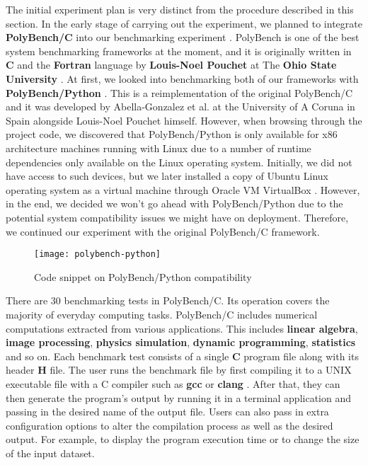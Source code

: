 The initial experiment plan is very distinct from the procedure described in this section. In the early stage of carrying out the experiment, we planned to integrate \textbf{PolyBench/C} into our benchmarking experiment \cite{exp39}. PolyBench is one of the best system benchmarking frameworks at the moment, and it is originally written in \textbf{C} and the \textbf{Fortran} language by \textbf{Louis-Noel Pouchet} at The \textbf{Ohio State University} \cite{exp40}. At first, we looked into benchmarking both of our frameworks with \textbf{PolyBench/Python} \cite{exp41}. This is a reimplementation of the original PolyBench/C and it was developed by Abella-Gonzalez et al. at the University of A Coruna in Spain alongside Louis-Noel Pouchet himself. However, when browsing through the project code, we discovered that PolyBench/Python is only available for x86 architecture machines running with Linux due to a number of runtime dependencies only available on the Linux operating system. Initially, we did not have access to such devices, but we later installed a copy of Ubuntu Linux operating system as a virtual machine through Oracle VM VirtualBox \cite{exp42} \cite{exp43}. However, in the end, we decided we won't go ahead with PolyBench/Python due to the potential system compatibility issues we might have on deployment. Therefore, we continued our experiment with the original PolyBench/C framework.

\bigskip
\begin{figure}[hp]
\centering
\texttt{[image: polybench-python]}
\caption{\footnotesize{Code snippet on PolyBench/Python compatibility}}
\captionsetup{aboveskip=0pt,font=it}
\end{figure}
\bigskip

There are 30 benchmarking tests in PolyBench/C. Its operation covers the majority of everyday computing tasks. PolyBench/C includes numerical computations extracted from various applications. This includes \textbf{linear algebra}, \textbf{image processing}, \textbf{physics simulation}, \textbf{dynamic programming}, \textbf{statistics} and so on. Each benchmark test consists of a single \textbf{C} program file along with its header \textbf{H} file. The user runs the benchmark file by first compiling it to a UNIX executable file with a C compiler such as \textbf{gcc} or \textbf{clang} \cite{exp44} \cite{exp45}. After that, they can then generate the program's output by running it in a terminal application and passing in the desired name of the output file. Users can also pass in extra configuration options to alter the compilation process as well as the desired output. For example, to display the program execution time or to change the size of the input dataset.

